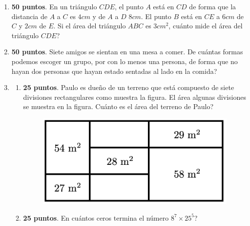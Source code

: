 \begin{center}
\end{center}

\begin{enumerate}
\item \textbf{50 puntos}. En un triángulo $CDE$, el punto $A$ está en $CD$ de forma que la distancia de $A$ a $C$ es $4cm$ y de $A$ a $D$ $8cm$. El punto $B$ está en $CE$ a $6cm$ de $C$ y $2cm$ de $E$. Si el área del triángulo $ABC$ es $3{cm}^2$, cuánto mide el área del triángulo $CDE$?

\item \textbf{50 puntos}. Siete amigos se sientan en una mesa a comer. De cuántas formas podemos escoger un grupo, por con lo menos una persona, de forma que no hayan dos personas que hayan estado sentadas al lado en la comida?

\item \hspace{1cm}
		\begin{enumerate}[label=\Alph*)]
			\item \textbf{25 puntos}. Paulo es dueño de un terreno que está compuesto de siete divisiones rectangulares como muestra la figura. El área algunas divisiones se muestra en la figura. Cuánto es el área del terreno de Paulo?
			\begin{figure}[H]
				\centering
				\includegraphics[width=0.4\linewidth]{2020_06_13/imgs/medio_p3_a}
				\label{medio_p3_a}
			\end{figure}
			
			\item \textbf{25 puntos}. En cuántos ceros termina el número $8^7\times 25^5$?
			

\end{enumerate}
\end{enumerate}
